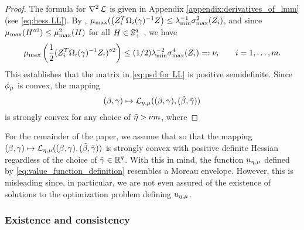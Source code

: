 \begin{proof}
The formula for $\nabla^2\operatorname{\mathcal{L}}$ is given in Appendix \ref{appendix:derivatives_of_lmm}
(see \eqref{eq:hess LL}).
By \cite[Theorem 3.1]{ABBP2021}, 
$\mu_{\text{max}}(\left(Z_i^T\Omega_i(\gamma)^{-1}Z\right)\le
\lambda_{\text{min}}^{-1}\sigma_{\text{max}}^2(Z_i)$, and since 
$\mu_{\text{max}}(H^{\circ 2})\le \mu_{\text{max}}^2(H)$
for all $H\in\operatorname{\mathbb{S}}^q_+$ \cite{HJ85}, we have
\[
\mu_{\text{max}}\left(\frac{1}{2}(Z_i^T\Omega_i(\gamma)^{-1}Z_i)^{\circ2}\right)
\le (1/2) \lambda_{\text{min}}^{-2}
\sigma^4_{\text{max}}(Z_i)=:\nu_i
\qquad  i=1,\dots,m.
\]
This establishes that the matrix in \eqref{eq:psd for LL} is positive semidefinite.
Since $\phi_\mu$ is convex, the mapping
\[
(\beta,\gam)\mapsto \LL_{\emu}(\bg,\tbg) %
\]
is strongly convex for any choice
of ${\bar\eta}> \nu m$, where 
\end{proof}
For the remainder of the paper, we assume that 
so that the mapping
$(\beta,\gamma)\mapsto \operatorname{\mathcal{L}}_{{\eta,\mu}}((\beta,\gamma),(\tilde\beta,{\tilde{\gamma}}))$ %
is strongly convex with 
positive definite Hessian
regardless of the 
choice of ${\tilde{\gamma}}\in\operatorname{\mathbb{R}}^q$. With this in mind, the function ${u_{\eta,\mu}}$ defined by
\eqref{eq:value_function_definition} resembles a Moreau envelope.
However, this is misleading since, in particular,
we are not even assured of the existence of solutions to
the optimization problem defining ${u_{\eta,\mu}}$. 

\subsubsection{Existence and consistency}\label{ssec:existence and consistency}

